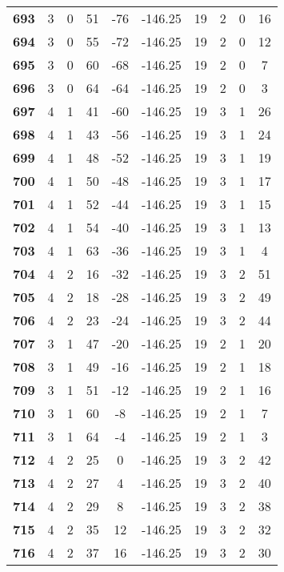 \documentclass{article}%
\begin{document}
\begin{longtable}{cccccccccc}
        \textbf{693} & 3 & 0 & 51 & -76 & -146.25 & 19 & 2 & 0 & 16 \\ 
        \textbf{694} & 3 & 0 & 55 & -72 & -146.25 & 19 & 2 & 0 & 12 \\ 
        \textbf{695} & 3 & 0 & 60 & -68 & -146.25 & 19 & 2 & 0 & 7 \\ 
        \textbf{696} & 3 & 0 & 64 & -64 & -146.25 & 19 & 2 & 0 & 3 \\ 
        \textbf{697} & 4 & 1 & 41 & -60 & -146.25 & 19 & 3 & 1 & 26 \\ 
        \textbf{698} & 4 & 1 & 43 & -56 & -146.25 & 19 & 3 & 1 & 24 \\ 
        \textbf{699} & 4 & 1 & 48 & -52 & -146.25 & 19 & 3 & 1 & 19 \\ 
        \textbf{700} & 4 & 1 & 50 & -48 & -146.25 & 19 & 3 & 1 & 17 \\ 
        \textbf{701} & 4 & 1 & 52 & -44 & -146.25 & 19 & 3 & 1 & 15 \\ 
        \textbf{702} & 4 & 1 & 54 & -40 & -146.25 & 19 & 3 & 1 & 13 \\ 
        \textbf{703} & 4 & 1 & 63 & -36 & -146.25 & 19 & 3 & 1 & 4 \\ 
        \textbf{704} & 4 & 2 & 16 & -32 & -146.25 & 19 & 3 & 2 & 51 \\ 
        \textbf{705} & 4 & 2 & 18 & -28 & -146.25 & 19 & 3 & 2 & 49 \\ 
        \textbf{706} & 4 & 2 & 23 & -24 & -146.25 & 19 & 3 & 2 & 44 \\ 
        \textbf{707} & 3 & 1 & 47 & -20 & -146.25 & 19 & 2 & 1 & 20 \\ 
        \textbf{708} & 3 & 1 & 49 & -16 & -146.25 & 19 & 2 & 1 & 18 \\ 
        \textbf{709} & 3 & 1 & 51 & -12 & -146.25 & 19 & 2 & 1 & 16 \\ 
        \textbf{710} & 3 & 1 & 60 & -8 & -146.25 & 19 & 2 & 1 & 7 \\ 
        \textbf{711} & 3 & 1 & 64 & -4 & -146.25 & 19 & 2 & 1 & 3 \\ 
        \textbf{712} & 4 & 2 & 25 & 0 & -146.25 & 19 & 3 & 2 & 42 \\ 
        \textbf{713} & 4 & 2 & 27 & 4 & -146.25 & 19 & 3 & 2 & 40 \\ 
        \textbf{714} & 4 & 2 & 29 & 8 & -146.25 & 19 & 3 & 2 & 38 \\ 
        \textbf{715} & 4 & 2 & 35 & 12 & -146.25 & 19 & 3 & 2 & 32 \\ 
        \textbf{716} & 4 & 2 & 37 & 16 & -146.25 & 19 & 3 & 2 & 30 \\ 

\end{longtable}
\end{document}
